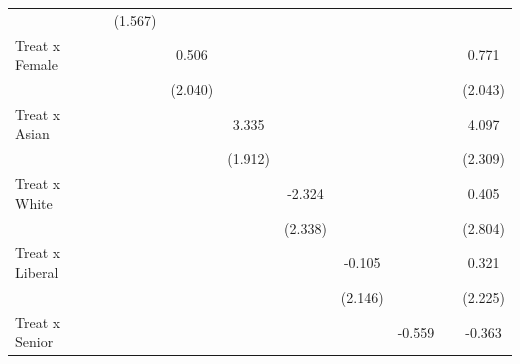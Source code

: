 \begin{table}[htbp]
\begin{tabular}{l*{10}{c}}
                                &                  &                  &  (1.567)         &                  &                  &                  &                  &                  &                  &                  \\
Treat x Female                  &                  &                  &                  &    0.506         &                  &                  &                  &                  &                  &    0.771         \\
                                &                  &                  &                  &  (2.040)         &                  &                  &                  &                  &                  &  (2.043)         \\
Treat x Asian                   &                  &                  &                  &                  &    3.335\sym{*}  &                  &                  &                  &                  &    4.097\sym{*}  \\
                                &                  &                  &                  &                  &  (1.912)         &                  &                  &                  &                  &  (2.309)         \\
Treat x White                   &                  &                  &                  &                  &                  &   -2.324         &                  &                  &                  &    0.405         \\
                                &                  &                  &                  &                  &                  &  (2.338)         &                  &                  &                  &  (2.804)         \\
Treat x Liberal                 &                  &                  &                  &                  &                  &                  &   -0.105         &                  &                  &    0.321         \\
                                &                  &                  &                  &                  &                  &                  &  (2.146)         &                  &                  &  (2.225)         \\
Treat x Senior                  &                  &                  &                  &                  &                  &                  &                  &   -0.559         &                  &   -0.363         \\

\end{tabular}
\end{table}
